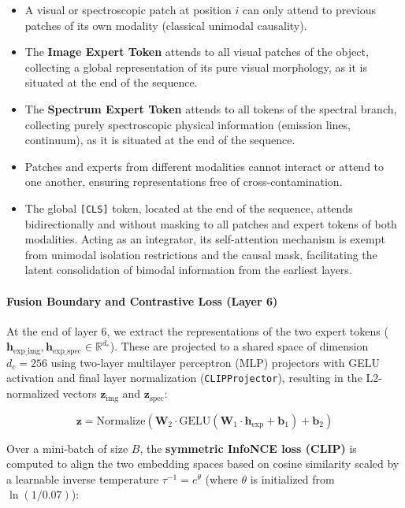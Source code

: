 \begin{itemize}
\item A visual or spectroscopic patch at position $i$ can only attend to previous patches of its own modality (classical unimodal causality).
\item The \textbf{Image Expert Token} attends to all visual patches of the object, collecting a global representation of its pure visual morphology, as it is situated at the end of the sequence.
\item The \textbf{Spectrum Expert Token} attends to all tokens of the spectral branch, collecting purely spectroscopic physical information (emission lines, continuum), as it is situated at the end of the sequence.
\item Patches and experts from different modalities cannot interact or attend to one another, ensuring representations free of cross-contamination.
\item The global \texttt{[CLS]} token, located at the end of the sequence, attends bidirectionally and without masking to all patches and expert tokens of both modalities. Acting as an integrator, its self-attention mechanism is exempt from unimodal isolation restrictions and the causal mask, facilitating the latent consolidation of bimodal information from the earliest layers.
\end{itemize}

\paragraph{Fusion Boundary and Contrastive Loss (Layer 6)}

At the end of layer 6, we extract the representations of the two expert tokens ($\mathbf{h}_{\text{exp\_img}}, \mathbf{h}_{\text{exp\_spec}} \in \mathbb{R}^{d_e}$). These are projected to a shared space of dimension $d_c = 256$ using two-layer multilayer perceptron (MLP) projectors with GELU activation and final layer normalization (\texttt{CLIPProjector}), resulting in the L2-normalized vectors $\mathbf{z}_{\text{img}}$ and $\mathbf{z}_{\text{spec}}$:

\begin{equation}
\mathbf{z} = \text{Normalize}\left(\mathbf{W}_2 \cdot \text{GELU}\left(\mathbf{W}_1 \cdot \mathbf{h}_{\text{exp}} + \mathbf{b}_1\right) + \mathbf{b}_2\right)
\label{eq:normalize_z}
\end{equation}

Over a mini-batch of size $B$, the \textbf{symmetric InfoNCE loss (CLIP)} is computed to align the two embedding spaces based on cosine similarity scaled by a learnable inverse temperature $\tau^{-1} = e^{\theta}$ (where $\theta$ is initialized from $\ln\left(1/0.07\right)$):

